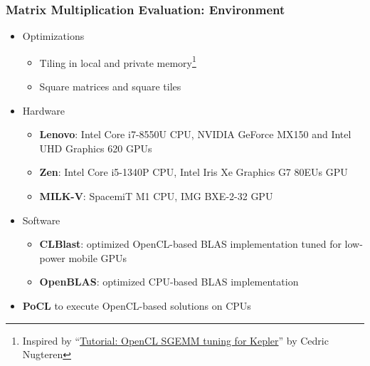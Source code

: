 \documentclass[xcolor=table,aspectratio=169]{beamer}
\begin{document}
\begin{frame}[fragile]
  \frametitle{Matrix Multiplication Evaluation: Environment}
  \begin{itemize}
    \item Optimizations
    \begin{itemize}
      \item Tiling in local and private memory\footnote{Inspired by ``\href{https://cnugteren.github.io/tutorial/pages/page1.html}{Tutorial: OpenCL SGEMM tuning for Kepler}'' by Cedric Nugteren} 
      \item Square matrices and square tiles
    \end{itemize}
    \item Hardware
    \begin{itemize}
      \item \textbf{Lenovo}: Intel Core i7-8550U CPU, NVIDIA GeForce MX150 and Intel UHD Graphics 620 GPUs
      \item \textbf{Zen}: Intel Core i5-1340P CPU, Intel Iris Xe Graphics G7 80EUs GPU
      \item \textbf{MILK-V}: SpacemiT M1 CPU, IMG BXE-2-32 GPU
    \end{itemize} 
    \item Software
    \begin{itemize}
      \item \textbf{CLBlast}: optimized OpenCL-based BLAS implementation tuned for low-power mobile GPUs
      \item \textbf{OpenBLAS}: optimized CPU-based BLAS implementation
    \end{itemize}
    \item \textbf{PoCL} to execute OpenCL-based solutions on CPUs
\end{itemize}

\end{frame}
\end{document}
